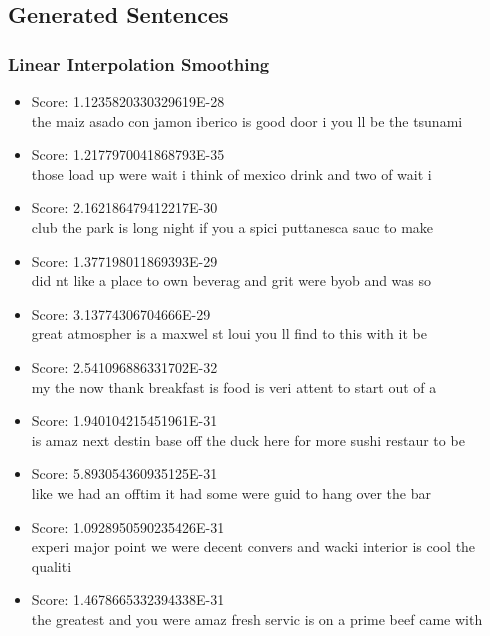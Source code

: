 \documentclass[paper=a4, fontsize=11pt]{jhwhw} %
\begin{document}
\subsection{Generated Sentences}
\subsubsection{Linear Interpolation Smoothing}
\begin{itemize}
\item Score: 1.1235820330329619E-28\\
the maiz asado con jamon iberico is good door i you ll be the tsunami
\item Score: 1.2177970041868793E-35\\
those load up were wait i think of mexico drink and two of wait i 
\item Score: 2.162186479412217E-30\\
club the park is long night if you a spici puttanesca sauc to make 
\item Score: 1.377198011869393E-29\\
did nt like a place to own beverag and grit were byob and was so 
\item Score: 3.13774306704666E-29\\
great atmospher is a maxwel st loui you ll find to this with it be 
\item Score: 2.541096886331702E-32\\
my the now thank breakfast is food is veri attent to start out of a 
\item Score: 1.940104215451961E-31\\
is amaz next destin base off the duck here for more sushi restaur to be 
\item Score: 5.893054360935125E-31\\
like we had an offtim it had some were guid to hang over the bar  
\item Score: 1.0928950590235426E-31\\
experi major point we were decent convers and wacki interior is cool the qualiti  
\item Score: 1.4678665332394338E-31\\
the greatest and you were amaz fresh servic is on a prime beef came with 
\end{itemize}
\end{document}
